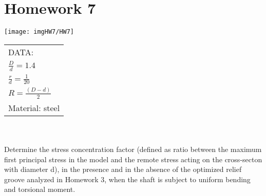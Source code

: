 \chapter{Homework 7}
\begin{minipage}{.70\textwidth}
\centering
\texttt{[image: imgHW7/HW7]}
\end{minipage}
\begin{minipage}{.70\textwidth}
\begin{tabular}{l}
        DATA:\\
        $\frac{D}{d} = 1.4 $\\
        $\frac{r}{d} = \frac{1}{20} $\\
        $R = \frac{(D-d)}{2}$\\
        Material: steel
\end{tabular}
\end{minipage}\\\\
Determine the stress concentration factor (defined as ratio between the maximum first principal stress in the model and the remote stress acting on the cross-secton with diameter d), in the presence and in the absence of the optimized relief groove analyzed in Homework 3, when the shaft is subject to uniform bending and torsional moment.
